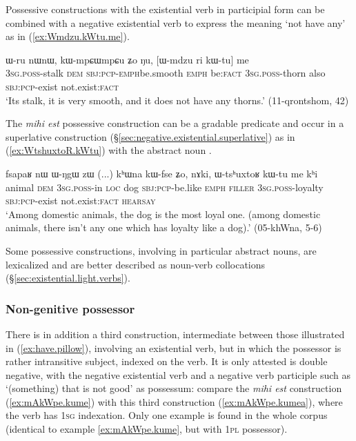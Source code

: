 Possessive constructions with the existential verb  in participial form can be combined with a negative existential verb  to express the meaning `not have any' as in (\ref{ex:Wmdzu.kWtu.me}).
 
\begin{exe}
\ex \label{ex:Wmdzu.kWtu.me}
\gll  ɯ-ru nɯnɯ, kɯ-mpɕɯ\redp{}mpɕu ʑo ŋu, [ɯ-mdzu ri kɯ-tu] me \\
\textsc{3sg}.\textsc{poss}-stalk \textsc{dem} \textsc{sbj}:\textsc{pcp}-\textsc{emph}\redp{}be.smooth \textsc{emph} be:\textsc{fact} \textsc{3sg}.\textsc{poss}-thorn also \textsc{sbj}:\textsc{pcp}-exist not.exist:\textsc{fact} \\
\glt `Its stalk, it is very smooth, and it does not have any thorns.' (11-qrontshom, 42)
\end{exe} 


The \textit{mihi est} possessive construction can be a gradable predicate and occur in a superlative construction (§\ref{sec:negative.existential.superlative}) as in (\ref{ex:WtshuxtoR.kWtu}) with the abstract noun .  

\begin{exe}
\ex \label{ex:WtshuxtoR.kWtu}
\gll  fsapaʁ nɯ ɯ-ŋgɯ zɯ (...) kʰɯna kɯ-fse ʑo, nɤki, ɯ-tsʰuxtoʁ kɯ-tu me kʰi \\
animal \textsc{dem} \textsc{3sg}.\textsc{poss}-in \textsc{loc} {  } dog \textsc{sbj}:\textsc{pcp}-be.like \textsc{emph} \textsc{filler} \textsc{3sg}.\textsc{poss}-loyalty \textsc{sbj}:\textsc{pcp}-exist not.exist:\textsc{fact} \textsc{hearsay} \\
\glt  `Among domestic animals, the dog is the most loyal one. (among domestic animals, there isn't any one which has loyalty like a dog).' (05-khWna, 5-6)
\end{exe}


Some possessive constructions, involving in particular abstract nouns,  are lexicalized and are better described as noun-verb collocations (§\ref{sec:existential.light.verbs}).

 \subsubsection{Non-genitive possessor} \label{sec:possessive.existential2}
There is in addition a third construction, intermediate between those illustrated in (\ref{ex:have.pillow}), involving an existential verb, but in which the possessor is rather intransitive subject, indexed on the verb. It is only attested is double negative, with the negative existential verb  and a negative verb participle such as  `(something) that is not good' as possessum: compare the \textit{mihi est} construction (\ref{ex:mAkWpe.kume}) with this third construction (\ref{ex:mAkWpe.kumea}), where the verb has \textsc{1sg} indexation. Only one example is found in the whole corpus (identical to example \ref{ex:mAkWpe.kume}, but with \textsc{1pl} possessor).
 

